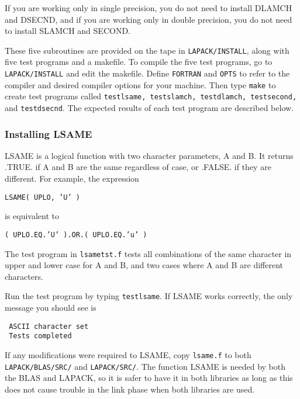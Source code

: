 \noindent
If you are working only in single precision, you do not need to install
DLAMCH and DSECND, and if you are working only in double precision,
you do not need to install SLAMCH and SECOND.

These five subroutines are provided on the tape in {\tt LAPACK/INSTALL},
along with five test programs and a makefile.  
To compile the five test programs, go to {\tt LAPACK/INSTALL}
and edit the makefile. 
Define {\tt FORTRAN} and {\tt OPTS} to refer to the 
compiler and desired compiler options for your machine.
Then type {\tt make} to create test programs called
{\tt testlsame, testslamch, testdlamch, testsecond,} and
{\tt testdsecnd}. 
The expected results of each test program are described below.

\subsubsection{Installing LSAME}
\dent
LSAME is a logical function with two character parameters, A and B.
It returns .TRUE. if A and B are the same regardless of case, or .FALSE.
if they are different. 
For example, the expression

\begin{list}{}{} 
\item {\tt LSAME( UPLO, 'U' )}
\end{list}
\noindent 
is equivalent to
\begin{list}{}{} 
\item {\tt ( UPLO.EQ.'U' ).OR.( UPLO.EQ.'u' )}
\end{list} 
 
The test program in {\tt lsametst.f} tests all combinations of
the same character in upper and lower case for A and B, and two
cases where A and B are different characters.

Run the test program by typing {\tt testlsame}.
If LSAME works correctly, the only message you should see is
\begin{verbatim}
 ASCII character set
 Tests completed
\end{verbatim}
If any modifications were required to LSAME, copy {\tt lsame.f} to both
{\tt LAPACK/BLAS/SRC/} and {\tt LAPACK/SRC/}. 
The function LSAME is needed by both the BLAS and LAPACK, so it is safer
to have it in both libraries as long as this does not cause trouble
in the link phase when both libraries are used.

